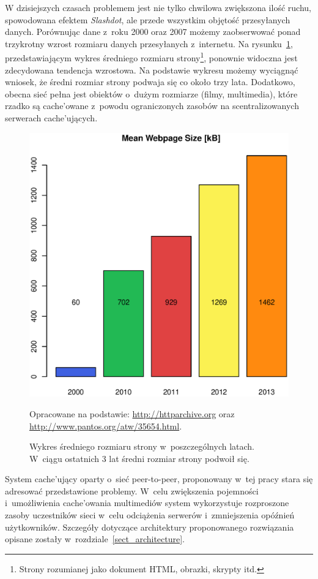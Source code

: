\documentclass[a4paper,11pt]{scrartcl}
\newcommand{\s}{ }
\newcommand{\keszujacy}{cache'ujący}
\newcommand{\keszujacych}{cache'ujących}
\newcommand{\keszowania}{cache'owania}
\newcommand{\keszowane}{cache'owane}
\begin{document}
W dzisiejszych czasach problemem jest nie tylko chwilowa zwiększona ilość ruchu, spowodowana efektem \textit{Slashdot}, ale przede wszystkim objętość przesyłanych danych. Porównując dane z~roku 2000 oraz 2007 możemy zaobserwować ponad trzykrotny wzrost rozmiaru danych przesyłanych z~internetu\cite{sadre2008changes}. Na rysunku~\ref{fig_mean_webpage}, przedstawiającym wykres średniego rozmiaru strony\footnote{Strony rozumianej jako dokument HTML, obrazki, skrypty itd.}, ponownie widoczna jest zdecydowana tendencja wzrostowa. Na podstawie wykresu możemy wyciągnąć wniosek, że średni rozmiar strony podwaja się co około trzy lata. Dodatkowo, obecna sieć pełna jest obiektów o~dużym rozmiarze (filmy, multimedia), które rzadko są \keszowane\s z~powodu ograniczonych zasobów na scentralizowanych serwerach \keszujacych\cite{sadre2008changes}.

\begin{figure}[h!]
\centering
\includegraphics[width=0.7\linewidth]{img/mean_webpage_size.eps}
\caption*{Opracowane na podstawie: \url{http://httparchive.org} oraz \url{http://www.pantos.org/atw/35654.html}.}
\caption{Wykres średniego rozmiaru strony w~poszczególnych latach. W~ciągu ostatnich 3 lat średni rozmiar strony podwoił się.}
\label{fig_mean_webpage}
\end{figure}

System \keszujacy\s oparty o~sieć peer-to-peer, proponowany w~tej pracy stara się adresować przedstawione problemy. W~celu zwiększenia pojemności i~umożliwienia \keszowania\s multimediów system wykorzystuje rozproszone zasoby uczestników sieci w~celu odciążenia serwerów i~zmniejszenia opóźnień użytkowników. Szczegóły dotyczące architektury proponowanego rozwiązania opisane zostały w~rozdziale~\ref{sect_architecture}.
\end{document}
